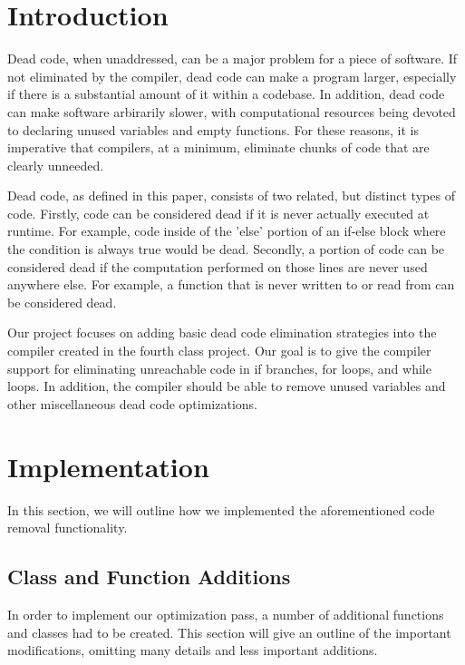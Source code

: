 \documentclass[sigconf]{acmart}
\begin{document}
\maketitle

\section{Introduction}
Dead code, when unaddressed, can be a major problem for a piece of software.
If not eliminated by the compiler, dead code can make a program 
larger, especially if there is a substantial amount of it within a codebase. In addition, dead code 
can make software arbirarily slower, with computational resources being devoted 
to declaring unused variables and empty functions. For these reasons, it is imperative that compilers, at 
a minimum, eliminate chunks of code that are clearly unneeded.

Dead code, as defined in this paper, consists of 
two related, but distinct types of code. Firstly, code can be considered dead if 
it is never actually executed at runtime. For example, code inside of the 'else' portion 
of an if-else block where the condition is always true would be dead. Secondly, a portion of 
code can be considered dead if the computation performed on those lines are never used anywhere else.
For example, a function that is never written to or read from can be considered dead. 

Our project focuses on adding basic dead code elimination strategies into the compiler 
created in the fourth class project. Our goal is to give the compiler support for eliminating
unreachable code in if branches, for loops, and while loops. In addition, the compiler should 
be able to remove unused variables and other miscellaneous dead code optimizations. 

\section{Implementation}
In this section, we will outline how we implemented the aforementioned code removal functionality.

\subsection{Class and Function Additions}
In order to implement our optimization pass, a number of additional functions and classes had to be created.
This section will give an outline of the important modifications, omitting many details and less important additions.
\end{document}
